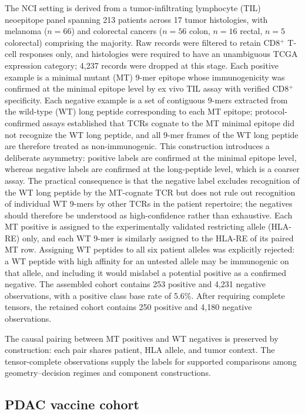 \documentclass[11pt]{article}
\begin{document}
The NCI setting is derived from a tumor-infiltrating
lymphocyte (TIL) neoepitope panel spanning 213 patients across
17 tumor histologies, with melanoma ($n=66$) and colorectal
cancers ($n=56$ colon, $n=16$ rectal, $n=5$ colorectal) comprising
the majority.
Raw records were filtered to retain CD8$^{+}$ T-cell responses
only, and histologies were required to have an unambiguous TCGA
expression category; 4{,}237 records were dropped at this stage.
Each positive example is a minimal mutant (MT) 9-mer epitope
whose immunogenicity was confirmed at the minimal epitope level
by ex vivo TIL assay with verified CD8$^{+}$ specificity.
Each negative example is a set of contiguous 9-mers extracted
from the wild-type (WT) long peptide corresponding to each MT
epitope; protocol-confirmed assays established that TCRs
cognate to the MT minimal epitope did not recognize the WT long
peptide, and all 9-mer frames of the WT long peptide are
therefore treated as non-immunogenic.
This construction introduces a deliberate asymmetry: positive
labels are confirmed at the minimal epitope level, whereas
negative labels are confirmed at the long-peptide level, which
is a coarser assay.
The practical consequence is that the negative label excludes
recognition of the WT long peptide by the MT-cognate TCR but
does not rule out recognition of individual WT 9-mers by other
TCRs in the patient repertoire; the negatives should therefore
be understood as high-confidence rather than exhaustive.
Each MT positive is assigned to the experimentally validated
restricting allele (HLA-RE) only, and each WT 9-mer is
similarly assigned to the HLA-RE of its paired MT row.
Assigning WT peptides to all six patient alleles was explicitly
rejected: a WT peptide with high affinity for an untested allele
may be immunogenic on that allele, and including it would
mislabel a potential positive as a confirmed negative.
The assembled cohort contains 253 positive and 4{,}231 negative
observations, with a positive class base rate of 5.6\%. After requiring
complete tensors, the retained cohort contains 250 positive and 4{,}180
negative observations.

The causal pairing between MT positives and WT negatives is
preserved by construction: each pair shares patient, HLA allele,
and tumor context. The tensor-complete observations supply the labels for
supported comparisons among geometry--decision regimes and component
constructions.

\subsection{PDAC vaccine cohort}
\end{document}
